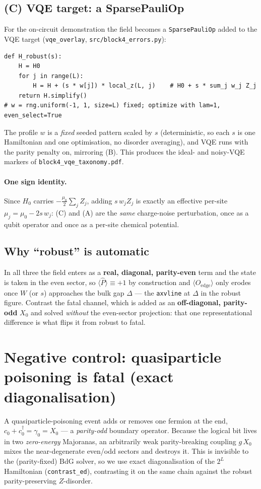 \documentclass[11pt]{article}
\newcommand{\expv}[1]{\langle #1\rangle}
\newcommand{\Pop}{\hat{P}}
\newcommand{\code}[1]{\texttt{#1}}
\begin{document}
\subsection{(C) VQE target: a SparsePauliOp}
For the on-circuit demonstration the field becomes a \code{SparsePauliOp} added to
the VQE target (\code{vqe\_overlay}, \code{src/block4\_errors.py}):
\begin{lstlisting}
def H_robust(s):
    H = H0
    for j in range(L):
        H = H + (s * w[j]) * local_z(L, j)    # H0 + s * sum_j w_j Z_j
    return H.simplify()
# w = rng.uniform(-1, 1, size=L) fixed; optimize with lam=1, even_select=True
\end{lstlisting}
The profile $w$ is a \emph{fixed} seeded pattern scaled by $s$ (deterministic, so
each $s$ is one Hamiltonian and one optimisation, no disorder averaging), and VQE
runs with the parity penalty on, mirroring (B). This produces the ideal- and
noisy-VQE markers of \code{block4\_vqe\_taxonomy.pdf}.

\paragraph{One sign identity.} Since $H_0$ carries $-\tfrac{\mu_0}{2}\sum_j Z_j$,
adding $s\,w_j Z_j$ is exactly an effective per-site $\mu_j=\mu_0-2s\,w_j$: (C) and
(A) are the \emph{same} charge-noise perturbation, once as a qubit operator and once
as a per-site chemical potential.

\subsection{Why ``robust'' is automatic}
In all three the field enters as a \textbf{real, diagonal, parity-even} term and the
state is taken in the even sector, so $\expv{\Pop}\equiv+1$ by construction and
$\expv{O_{\mathrm{edge}}}$ only erodes once $W$ (or $s$) approaches the bulk gap
$\Delta$ --- the \code{axvline} at $\Delta$ in the robust figure. Contrast the fatal
channel, which is added as an \textbf{off-diagonal, parity-odd} $X_0$ and solved
\emph{without} the even-sector projection: that one representational difference is
what flips it from robust to fatal.

\section{Negative control: quasiparticle poisoning is fatal (exact diagonalisation)}
\label{sec:fatal}
A quasiparticle-poisoning event adds or removes one fermion at the end,
$c_0+c_0^\dagger=\gamma_0=X_0$ --- a \emph{parity-odd} boundary operator. Because
the logical bit lives in two \emph{zero-energy} Majoranas, an arbitrarily weak
parity-breaking coupling $g\,X_0$ mixes the near-degenerate even/odd sectors and
destroys it. This is invisible to the (parity-fixed) BdG solver, so we use exact
diagonalisation of the $2^L$ Hamiltonian (\code{contrast\_ed}), contrasting it on
the same chain against the robust parity-preserving $Z$-disorder.
\end{document}
